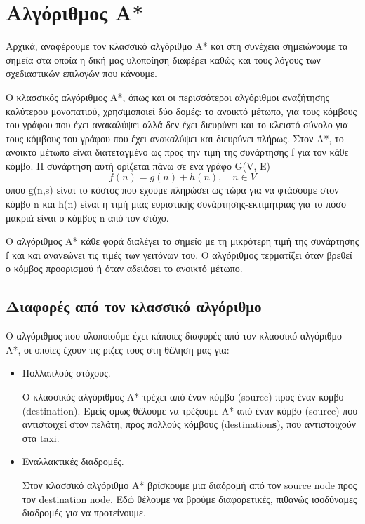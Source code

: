 \documentclass[a4paper,oneside, 11pt]{article}
\begin{document}
\section{Αλγόριθμος A*}
Αρχικά, αναφέρουμε τον κλασσικό αλγόριθμο A* και στη συνέχεια σημειώνουμε τα σημεία στα οποία η δική μας υλοποίηση διαφέρει καθώς και τους λόγους των σχεδιαστικών επιλογών που κάνουμε. \bigbreak 

Ο κλασσικός αλγόριθμος A*, όπως και οι περισσότεροι αλγόριθμοι αναζήτησης καλύτερου μονοπατιού, χρησιμοποιεί δύο δομές: το ανοικτό μέτωπο, για τους κόμβους του γράφου που έχει ανακαλύψει αλλά δεν έχει διευρύνει και το κλειστό σύνολο για τους κόμβους του γράφου που έχει ανακαλύψει και διευρύνει πλήρως. Στον A*, το ανοικτό μέτωπο είναι διατεταγμένο ως προς την τιμή της συνάρτησης f για τον κάθε κόμβο. Η συνάρτηση αυτή ορίζεται πάνω σε ένα γράφο G(V, E)
$$
f(n) = g(n) + h(n), \quad n\in V
$$
όπου g(n,s) είναι το κόστος που έχουμε πληρώσει ως τώρα για να φτάσουμε στον κόμβο n και h(n) είναι η τιμή μιας ευριστικής συνάρτησης-εκτιμήτριας για το πόσο μακριά είναι ο κόμβος n από τον στόχο. \bigbreak

Ο αλγόριθμος A* κάθε φορά διαλέγει το σημείο με τη μικρότερη τιμή της συνάρτησης f και και ανανεώνει τις τιμές των γειτόνων του. Ο αλγόριθμος τερματίζει όταν βρεθεί ο κόμβος προορισμού ή όταν αδειάσει το ανοικτό μέτωπο.

\subsection{Διαφορές από τον κλασσικό αλγόριθμο}

Ο αλγόριθμος που υλοποιούμε έχει κάποιες διαφορές από τον κλασσικό αλγόριθμο A*, οι οποίες έχουν τις ρίζες τους στη θέληση μας για:
\begin{itemize}
\item Πολλαπλούς στόχους. \par 
Ο κλασσικός αλγόριθμος A* τρέχει από έναν κόμβο (source) προς έναν κόμβο (destination). Εμείς όμως θέλουμε να τρέξουμε A* από έναν κόμβο (source) που αντιστοιχεί στον πελάτη, προς πολλούς κόμβους (destination\textbf s), που αντιστοιχούν στα taxi. 
\item Εναλλακτικές διαδρομές. \par 
Στον κλασσικό αλγόριθμο A* βρίσκουμε μια διαδρομή από τον source node προς τον destination node. Εδώ θέλουμε να βρούμε διαφορετικές, πιθανώς ισοδύναμες διαδρομές για να προτείνουμε.
\end{itemize}
\end{document}
